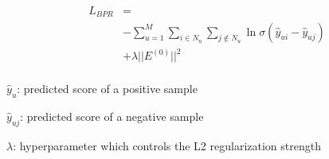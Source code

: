 \begin{equation}
    \begin{aligned}
        L_{BPR} & =                                                                                             \\
                & -\sum_{u = 1}^M \sum_{i \in N_u} \sum_{j \notin N_u} \ln{\sigma(\hat{y}_{ui} - \hat{y}_{uj})} \\
                & + \lambda ||E^{(0)}||^2                                                                       \\
    \end{aligned}
\end{equation}

$\hat{y}_{u}$: predicted score of a positive sample

$\hat{y}_{uj}$: predicted score of a negative sample

$\lambda$: hyperparameter which controls the L2 regularization strength
